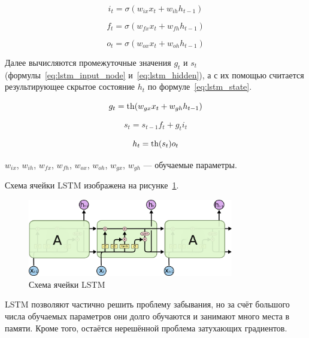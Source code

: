 \begin{equation}
    \label{eq:lstm_input}
    i_t = \sigma(w_{ix}x_t+w_{ih}h_{t-1})
\end{equation}

\begin{equation}
    \label{eq:lstm_forget}
    f_t = \sigma(w_{fx}x_t+w_{fh}h_{t-1})
\end{equation}

\begin{equation}
    \label{eq:lstm_output}
    o_t = \sigma(w_{ox}x_t+w_{oh}h_{t-1})
\end{equation}

Далее вычисляются промежуточные значения $g_t$ и $s_t$ (формулы \ref*{eq:lstm_input_node} и \ref*{eq:lstm_hidden}), а с их помощью считается результирующее скрытое состояние $h_t$ по формуле \ref*{eq:lstm_state}.

\begin{equation}
    \label{eq:lstm_input_node}
    g_t = \operatorname{th}(w_{gx}x_t+w_{gh}h_{t-1})
\end{equation}

\begin{equation}
    \label{eq:lstm_hidden}
    s_t = s_{t-1}f_t+g_ti_t
\end{equation}

\begin{equation}
    \label{eq:lstm_state}
    h_t = \operatorname{th}(s_t)o_t
\end{equation}

$w_{ix}$, $w_{ih}$, $w_{fx}$, $w_{fh}$, $w_{ox}$, $w_{oh}$, $w_{gx}$, $w_{gh}$ --- обучаемые параметры.

Схема ячейки LSTM изображена на рисунке \ref*{fig:lstm}.

\begin{figure}[h]
    \centering
    \includegraphics[width=0.8\textwidth]{../inc/images/lstm.png}
    \caption{Схема ячейки LSTM}
    \label{fig:lstm}
\end{figure}

LSTM позволяют частично решить проблему забывания, но за счёт большого числа обучаемых параметров они долго обучаются и занимают много места в памяти. Кроме того, остаётся нерешённой проблема затухающих градиентов.

